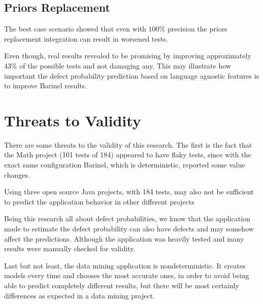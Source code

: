 \subsection{Priors Replacement}

The best case scenario showed that even with $100\%$ precision the priors replacement integration can result in worsened tests. 

Even though, real results revealed to be promising by improving approximately $43\%$ of the possible tests and not damaging any. This may illustrate how important the defect probability prediction based on language agnostic features is to improve Barinel results.

\section{Threats to Validity}

There are some threats to the validity of this research. The first is the fact that the Math project (101 tests of 184) appeared to have flaky tests, since with the exact same configuration Barinel, which is deterministic, reported some value changes. 

Using three open source Java projects, with 184 tests, may also not be sufficient to predict the application behavior in other different projects

Being this research all about defect probabilities, we know that the application made to estimate the defect probability can also have defects and may somehow affect the predictions. Although the application was heavily tested and many results were manually checked for validity.

Last but not least, the data mining application is nondeterministic. It creates models every time and chooses the most accurate ones, in order to avoid being able to predict completely different results, but there will be most certainly differences as expected in a data mining project.
